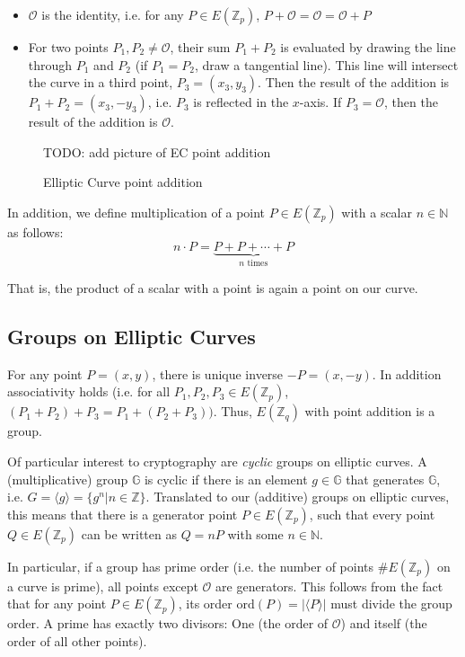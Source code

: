 \begin{itemize}
    \item $\mathcal{O}$ is the identity, i.e. for any $P \in E(\mathbb{Z}_p)$, $P + \mathcal{O} = \mathcal{O} = \mathcal{O} + P$ 
    \item For two points $P_1, P_2 \neq \mathcal{O}$, their sum $P_1 + P_2$ is evaluated by drawing the line through $P_1$ and $P_2$ (if $P_1 = P_2$, draw a tangential line). 
        This line will intersect the curve in a third point, $P_3 = (x_3, y_3)$.
        Then the result of the addition is $P_1 + P_2 = (x_3, -y_3)$, i.e. $P_3$ is reflected in the $x$-axis.
        If $P_3 = \mathcal{O}$, then the result of the addition is $\mathcal{O}$.
\end{itemize}

\begin{figure}
    TODO: add picture of EC point addition
    \caption{Elliptic Curve point addition}
\end{figure}

In addition, we define multiplication of a point $P \in E(\mathbb{Z}_p)$ with a scalar $n \in \mathbb{N}$ as follows:
\begin{equation}
    n \cdot P = \underbrace{P + P + \cdots + P}_{n \text{ times}}
\end{equation}

That is, the product of a scalar with a point is again a point on our curve.
\\

\subsection{Groups on Elliptic Curves}
For any point $P = (x,y)$, there is unique inverse $-P = (x, -y)$.
In addition associativity holds (i.e. for all $P_1, P_2, P_3 \in E(\mathbb{Z}_p)$, $(P_1 + P_2) + P_3 = P_1 + (P_2 + P_3))$.
Thus, $E(\mathbb{Z}_q)$ with point addition is a group. \cite{katz_introduction_2015}

Of particular interest to cryptography are \emph{cyclic} groups on elliptic curves. 
A (multiplicative) group $\mathbb{G}$ is cyclic if there is an element $g \in \mathbb{G}$ that generates $\mathbb{G}$, i.e. $G = \langle g \rangle = \{g^n | n \in \mathbb{Z}\}$.
Translated to our (additive) groups on elliptic curves, this means that there is a generator point $P \in E(\mathbb{Z}_p)$, such that every point $Q \in E(\mathbb{Z}_p)$ can be written as $Q = nP$ with some $n \in \mathbb{N}$.

In particular, if a group has prime order (i.e. the number of points $\#E(\mathbb{Z}_p)$ on a curve is prime), all points except $\mathcal{O}$ are generators.
This follows from the fact that for any point $P \in E(\mathbb{Z}_p)$, its order $\text{ord}(P) = | \langle P \rangle |$ must divide the group order.
A prime has exactly two divisors: One (the order of $\mathcal{O}$) and itself (the order of all other points).

